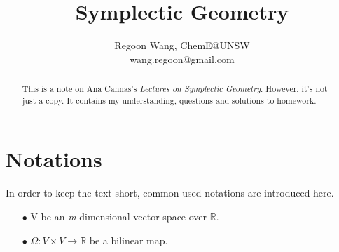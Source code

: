 \documentclass{paper}
\begin{document}
 
\title{Symplectic Geometry}
\author{Regoon Wang, ChemE@UNSW \\ wang.regoon@gmail.com} 


\maketitle
\begin{abstract}
This is a note on Ana Cannas's \textit{Lectures on Symplectic Geometry}. However, it's not just a copy. It contains my
understanding, questions and solutions to homework. 
\end{abstract} 

\tableofcontents
\section{Notations}
In order to keep the text short, common used notations are introduced here.
\begin{enumerate}
\item[$\bullet$] V be an \textit{m}-dimensional vector space over $\mathbb{R}$. 
\item[$\bullet$] $\Omega:V\times V\rightarrow \mathbb{R}$ be a bilinear map.
\end{enumerate}
\end{document}
